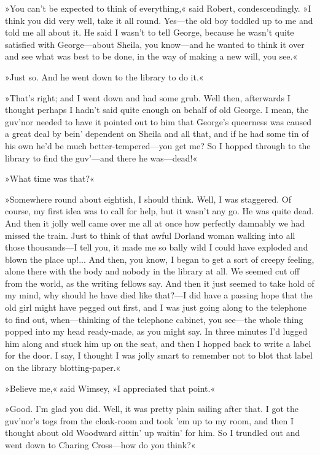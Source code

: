 »You can't be expected to think of everything,« said Robert, condescendingly. »I think you did very well, take it all round. Yes\allowbreak---\allowbreak the old boy toddled up to me and told me all about it. He said I wasn't to tell George, because he wasn't quite satisfied with George\allowbreak---\allowbreak about Sheila, you know\allowbreak---\allowbreak and he wanted to think it over and see what was best to be done, in the way of making a new will, you see.«

»Just so. And he went down to the library to do it.«

»That's right; and I went down and had some grub. Well then, afterwards I thought perhaps I hadn't said quite enough on behalf of old George. I mean, the guv'nor needed to have it pointed out to him that George's queerness was caused a great deal by bein' dependent on Sheila and all that, and if he had some tin of his own he'd be much better-tempered\allowbreak---\allowbreak you get me? So I hopped through to the library to find the guv'---and there he was\allowbreak---\allowbreak dead!«

»What time was that?«

»Somewhere round about eightish, I should think. Well, I was staggered. Of course, my first idea was to call for help, but it wasn't any go. He was quite dead. And then it jolly well came over me all at once how perfectly damnably we had missed the train. Just to think of that awful Dorland woman walking into all those thousands\allowbreak---\allowbreak I tell you, it made me so bally wild I could have exploded and blown the place up!... And then, you know, I began to get a sort of creepy feeling, alone there with the body and nobody in the library at all. We seemed cut off from the world, as the writing fellows say. And then it just seemed to take hold of my mind, why should he have died like that?---I did have a passing hope that the old girl might have pegged out first, and I was just going along to the telephone to find out, when\allowbreak---\allowbreak thinking of the telephone cabinet, you see\allowbreak---\allowbreak the whole thing popped into my head ready-made, as you might say. In three minutes I'd lugged him along and stuck him up on the seat, and then I hopped back to write a label for the door. I say, I thought I was jolly smart to remember not to blot that label on the library blotting-paper.«

»Believe me,« said Wimsey, »I appreciated that point.«

»Good. I'm glad you did. Well, it was pretty plain sailing after that. I got the guv'nor's togs from the cloak-room and took 'em up to my room, and then I thought about old Woodward sittin' up waitin' for him. So I trundled out and went down to Charing Cross\allowbreak---\allowbreak how do you think?«

